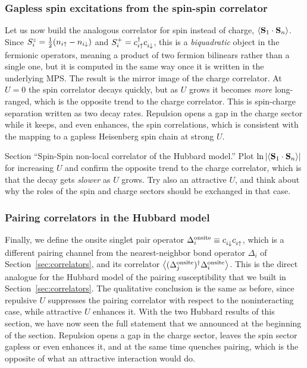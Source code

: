 \documentclass[lecture_notes.tex]{subfiles}
\begin{document}
\subsubsection{Gapless spin excitations from the spin-spin correlator}
Let us now build the analogous correlator for spin instead of charge, $\expval{\vb S_1\cdot\vb S_n}$.
Since $S_i^z = \tfrac12(n_{i\uparrow}-n_{i\downarrow})$ and $S_i^+=\cre{i\up}\ann{i\dn}$, this is a
\emph{biquadratic} object in the fermionic operators, meaning a product of two fermion bilinears
rather than a single one, but it is computed in the same way once it is written in the underlying
MPS. The result is the mirror image of the charge correlator. At $U=0$ the spin correlator decays
quickly, but as $U$ grows it becomes \emph{more} long-ranged, which is the opposite trend to the
charge correlator. This is spin-charge separation written as two decay rates. Repulsion opens a gap
in the charge sector while it keeps, and even enhances, the spin correlations, which is consistent
with the mapping to a gapless Heisenberg spin chain at strong $U$.

\begin{notebook}
Section ``Spin-Spin non-local correlator of the Hubbard model.'' Plot $\ln\abs{\expval{\vb
S_1\cdot\vb S_n}}$ for increasing $U$ and confirm the opposite trend to the charge correlator,
which is that the decay gets \emph{slower} as $U$ grows. Try also an attractive $U$, and think about
why the roles of the spin and charge sectors should be exchanged in that case.
\end{notebook}

\subsubsection{Pairing correlators in the Hubbard model}
Finally, we define the onsite singlet pair operator $\Delta_i^{\mathrm{onsite}} \equiv
\ann{i\dn}\ann{i\up}$, which is a different pairing channel from the nearest-neighbor bond operator
$\Delta_i$ of Section~\ref{sec:correlators}, and its correlator
$\expval{(\Delta_j^{\mathrm{onsite}})^{\dagger}\Delta_i^{\mathrm{onsite}}}$. This is the direct
analogue for the Hubbard model of the pairing susceptibility that we built in
Section~\ref{sec:correlators}. The qualitative conclusion is the same as before, since repulsive
$U$ suppresses the pairing correlator with respect to the noninteracting case, while attractive $U$
enhances it. With the two Hubbard results of this section, we have now seen the full statement that
we announced at the beginning of the section. Repulsion opens a gap in the charge sector, leaves the
spin sector gapless or even enhances it, and at the same time quenches pairing, which is the opposite of what an attractive interaction would do.
\end{document}
